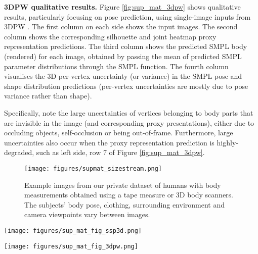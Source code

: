 \documentclass[final]{cvpr}
\begin{document}
\noindent \textbf{3DPW qualitative results.}
Figure \ref{fig:sup_mat_3dpw} shows qualitative results, particularly focusing on pose prediction, using single-image inputs from 3DPW \cite{vonMarcard2018}. The first column on each side shows the input images. The second column shows the corresponding silhouette and joint heatmap proxy representation predictions. The third column shows the predicted SMPL \cite{SMPL:2015} body (rendered) for each image, obtained by passing the mean of predicted SMPL parameter distributions through the SMPL function. The fourth column visualises the 3D per-vertex uncertainty (or variance) in the SMPL pose and shape distribution predictions (per-vertex uncertainties are mostly due to pose variance rather than shape). 

Specifically, note the large uncertainties of vertices belonging to body parts that are invisible in the image (and corresponding proxy presentations), either due to occluding objects, self-occlusion or being out-of-frame. Furthermore, large uncertainties also occur when the proxy representation prediction is highly-degraded, such as left side, row 7 of Figure \ref{fig:sup_mat_3dpw}.

\begin{figure}
    \centering
    \texttt{[image: figures/supmat\_sizestream.png]}
    \caption{Example images from our private dataset of humans with body measurements obtained using a tape measure or 3D body scanners. The subjects' body pose, clothing, surrounding environment and camera viewpoints vary between images.}
    \label{fig:supmat_sizestream}
\end{figure}

\begin{figure*}
    \centering
    \texttt{[image: figures/sup\_mat\_fig\_ssp3d.png]}
    \vspace{-0.25in}
    \caption{Qualitative results on groups of input images from SSP-3D \cite{STRAPS2020BMVC}. Black dots indicate left hands. Within each cell: 1st column is group of input images, 2nd column is predicted SMPL body, 3rd and 4th columns show 3D per-vertex uncertainty in the SMPL \textit{shape} distribution prediction, 5th column is the probabilistically-combined body shape. Challenging poses lead to large shape prediction uncertainty.}
    \label{fig:sup_mat_ssp3d}
\end{figure*}

\begin{figure*}
    \centering
    \texttt{[image: figures/sup\_mat\_fig\_3dpw.png]}
    \caption{Qualitative results using single-image inputs from 3DPW \cite{vonMarcard2018}. Black dots indicate left hands. On each side: 1st column is input image, 2nd column is predicted proxy representation, 3rd column is predicted SMPL body and 4th column is 3D per-vertex uncertainty in the SMPL pose and shape distribution prediction. Vertices of occluded and out-of-frame body parts have higher prediction uncertainties.}
    \label{fig:sup_mat_3dpw}
\end{figure*}

\clearpage

{\small


}
\end{document}
